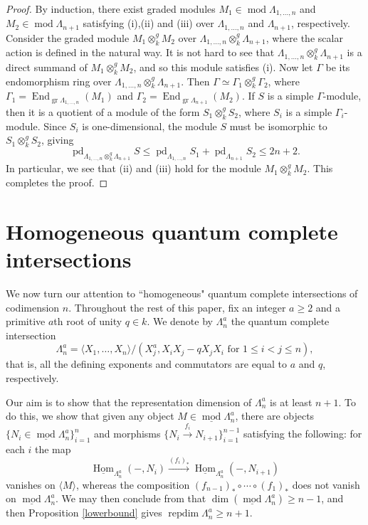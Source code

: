 \documentclass[a4paper]{amsart}
\theoremstyle{definition}
\theoremstyle{definition}
\theoremstyle{definition}
\theoremstyle{definition}
\theoremstyle{definition}
\theoremstyle{definition}
\theoremstyle{remark}
\theoremstyle{remark}
\theoremstyle{definition}
\theoremstyle{definition}
\begin{document}
\begin{proof}
By induction, there exist graded modules $M_1 \in {\operatorname{mod}\nolimits} \Lambda_{1,
\dots, n}$ and $M_2 \in {\operatorname{mod}\nolimits} \Lambda_{n+1}$ satisfying (i),(ii) and
(iii) over $\Lambda_{1, \dots, n}$ and $\Lambda_{n+1}$,
respectively. Consider the graded module $M_1 \otimes_k^g M_2$ over
$\Lambda_{1, \dots, n} \otimes^g_k \Lambda_{n+1}$, where the scalar
action is defined in the natural way. It is not hard to see that
$\Lambda_{1, \dots, n} \otimes^g_k \Lambda_{n+1}$ is a direct
summand of $M_1 \otimes_k^g M_2$, and so this module satisfies (i).
Now let $\Gamma$ be its endomorphism ring over $\Lambda_{1, \dots,
n} \otimes^g_k \Lambda_{n+1}$. Then $\Gamma \simeq \Gamma_1
\otimes_k^g \Gamma_2$, where $\Gamma_1 = {\operatorname{End}\nolimits}_{{\operatorname{gr}\nolimits} \Lambda_{1,
\dots, n}} (M_1)$ and $\Gamma_2 = {\operatorname{End}\nolimits}_{{\operatorname{gr}\nolimits} \Lambda_{n+1}}(M_2)$. If
$S$ is a simple $\Gamma$-module, then it is a quotient of a module
of the form $S_1 \otimes_k^g S_2$, where $S_i$ is a simple
$\Gamma_i$-module. Since $S_i$ is one-dimensional, the module $S$
must be isomorphic to $S_1 \otimes_k^g S_2$, giving
$${\operatorname{pd}\nolimits}_{\Lambda_{1, \dots, n} \otimes^g_k \Lambda_{n+1}} S \le
{\operatorname{pd}\nolimits}_{\Lambda_{1, \dots, n}} S_1 + {\operatorname{pd}\nolimits}_{\Lambda_{n+1}} S_2 \le 2n +
2.$$ In particular, we see that (ii) and (iii) hold for the module
$M_1 \otimes_k^g M_2$. This completes the proof.
\end{proof}

\section{Homogeneous quantum complete intersections}

We now turn our attention to ``homogeneous" quantum complete
intersections of codimension $n$. Throughout the rest of this paper,
fix an integer $a \ge 2$ and a primitive $a$th root of unity $q \in
k$. We denote by $\Lambda_n^a$ the quantum complete intersection
$$\Lambda_n^a = \langle X_1, \dots, X_n \rangle / (X_j^a, X_iX_j -
qX_jX_i \text{ for } 1 \le i <j \le n ),$$ that is, all the defining
exponents and commutators are equal to $a$ and $q$, respectively.

Our aim is to show that the representation dimension of
$\Lambda_n^a$ is at least $n+1$. To do this, we show that given any
object $M \in \underline{\operatorname{mod}\nolimits} \Lambda^a_n$, there are objects $\{
N_i \in \underline{\operatorname{mod}\nolimits} \Lambda^a_n \}_{i=1}^n$ and morphisms $\{
N_i \xrightarrow{f_i} N_{i+1} \}_{i=1}^{n-1}$ satisfying the
following: for each $i$ the map
$$\underline{\operatorname{Hom}\nolimits}_{\Lambda^a_n}(-,N_i) \xrightarrow{(f_i)_*}
\underline{\operatorname{Hom}\nolimits}_{\Lambda^a_n}(-,N_{i+1})$$ vanishes on $\langle M
\rangle$, whereas the composition $(f_{n-1})_* \circ \cdots \circ
(f_1)_*$ does not vanish on $\underline{\operatorname{mod}\nolimits} \Lambda^a_n$. We may
then conclude from \cite[Lemma 4.11]{Rouquier1} that $\dim (
\underline{\operatorname{mod}\nolimits} \Lambda^a_n ) \ge n-1$, and then Proposition
\ref{lowerbound} gives ${\operatorname{repdim}\nolimits} \Lambda^a_n \ge n+1$.
\end{document}
